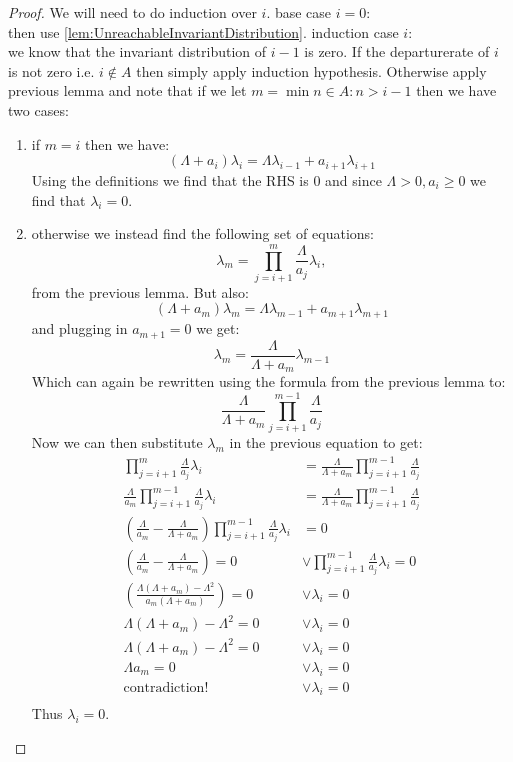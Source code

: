 \begin{proof}
  We will need to do induction over $i$.
  base case $i = 0$:\\
  \qquad then use \ref{lem:UnreachableInvariantDistribution}.
  induction case $i$:\\
  \qquad we know that the invariant distribution of $i-1$ is zero. If the departurerate of $i$ is not
  zero i.e. $i \notin A$ then simply apply induction hypothesis. Otherwise apply previous lemma and note that
  if we let $m = \min{n \in A \colon n > i} - 1$ then we have two cases:
  \begin{enumerate}
  \item if $m = i$ then we have:
  $$(\Lambda+a_i)\lambda_i = \Lambda\lambda_{i-1} + a_{i+1} \lambda_{i+1}$$
  Using the definitions we find that the RHS is $0$ and since $\Lambda > 0, a_i \geq 0$ we find that
  $\lambda_i = 0$.
  \item otherwise we instead find the following set of equations:
  $$\lambda_m = \prod_{j=i+1}^m \frac{\Lambda}{a_j} \lambda_i,$$
  from the previous lemma. But also:
  $$(\Lambda+a_m)\lambda_m = \Lambda \lambda_{m-1} + a_{m+1}\lambda_{m+1}$$
  and plugging in $a_{m+1} = 0$ we get:
  $$\lambda_m = \frac{\Lambda}{\Lambda + a_m}\lambda_{m-1}$$
  Which can again be rewritten using the formula from the previous lemma to:
  $$\frac{\Lambda}{\Lambda + a_m}\prod_{j=i+1}^{m-1} \frac{\Lambda}{a_j}$$
  Now we can then substitute $\lambda_m$ in the previous equation to get:
  \begin{align*}
  \prod_{j=i+1}^m \frac{\Lambda}{a_j} \lambda_i &= \frac{\Lambda}{\Lambda + a_m}\prod_{j=i+1}^{m-1} \frac{\Lambda}{a_j}\\
  \frac{\Lambda}{a_m}\prod_{j=i+1}^{m-1} \frac{\Lambda}{a_j} \lambda_i &= \frac{\Lambda}{\Lambda + a_m}\prod_{j=i+1}^{m-1} \frac{\Lambda}{a_j}\\
  (\frac{\Lambda}{a_m} - \frac{\Lambda}{\Lambda + a_m})\prod_{j=i+1}^{m-1} \frac{\Lambda}{a_j} \lambda_i &= 0\\
  (\frac{\Lambda}{a_m} - \frac{\Lambda}{\Lambda + a_m}) = 0 &\vee \prod_{j=i+1}^{m-1} \frac{\Lambda}{a_j} \lambda_i = 0\\
  (\frac{\Lambda(\Lambda + a_m)-\Lambda^2}{a_m(\Lambda + a_m)}) = 0 &\vee \lambda_i = 0\\
  \Lambda(\Lambda + a_m)-\Lambda^2 = 0 &\vee \lambda_i = 0\\
  \Lambda(\Lambda + a_m)-\Lambda^2 = 0 &\vee \lambda_i = 0\\
  \Lambda a_m = 0 &\vee \lambda_i = 0\\
  \text{contradiction!} &\vee \lambda_i = 0\\
  \end{align*}
  Thus $\lambda_i = 0$.
\end{enumerate}
\end{proof}


